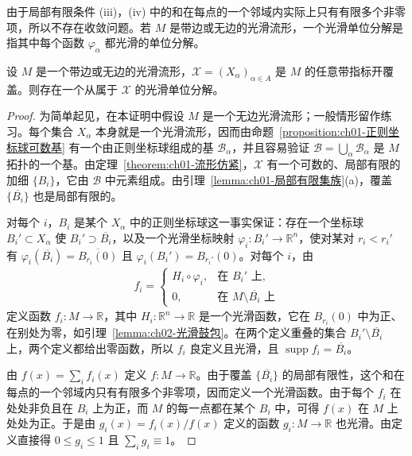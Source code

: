 \documentclass[../../main.tex]{subfiles}
\begin{document}
由于局部有限条件 (iii)，(iv) 中的和在每点的一个邻域内实际上只有有限多个非零项，所以不存在收敛问题。若 $M$ 是带边或无边的光滑流形，一个光滑单位分解是指其中每个函数 $\varphi_{\alpha}$ 都光滑的单位分解。

\begin{theorem}[单位分解的存在性]\label{theorem:ch02-单位分解存在性}
设 $M$ 是一个带边或无边的光滑流形，$\mathcal{X}=(X_{\alpha})_{\alpha\in A}$ 是 $M$ 的任意带指标开覆盖。则存在一个从属于 $\mathcal{X}$ 的光滑单位分解。
\end{theorem}

\begin{proof}
为简单起见，在本证明中假设 $M$ 是一个无边光滑流形；一般情形留作练习。每个集合 $X_{\alpha}$ 本身就是一个光滑流形，因而由命题~\cref{proposition:ch01-正则坐标球可数基} 有一个由正则坐标球组成的基 $\mathcal{B}_{\alpha}$，并且容易验证 $\mathcal{B}=\bigcup_{\alpha}\mathcal{B}_{\alpha}$ 是 $M$ 拓扑的一个基。由定理~\cref{theorem:ch01-流形仿紧}，$\mathcal{X}$ 有一个可数的、局部有限的加细 $\{B_{i}\}$，它由 $\mathcal{B}$ 中元素组成。由引理~\cref{lemma:ch01-局部有限集族}(a)，覆盖 $\{\overline{B_{i}}\}$ 也是局部有限的。

对每个 $i$，$B_{i}$ 是某个 $X_{\alpha}$ 中的正则坐标球这一事实保证：存在一个坐标球 $B_{i}'\subset X_{\alpha}$ 使 $B_{i}'\supset\overline{B_{i}}$，以及一个光滑坐标映射 $\varphi_{i}:B_{i}'\to\mathbb{R}^{n}$，使对某对 $r_{i}<r_{i}'$ 有 $\varphi_{i}(\overline{B_{i}})=\overline{B_{r_{i}}(0)}$ 且 $\varphi_{i}(B_{i}')=B_{r_{i}'}(0)$。对每个 $i$，由
\begin{align*}
f_{i}=
\begin{cases}
H_{i}\circ\varphi_{i}, & \text{在 }B_{i}'\text{ 上},\\
0, & \text{在 }M\setminus\overline{B_{i}}\text{ 上}
\end{cases}
\end{align*}
定义函数 $f_{i}:M\to\mathbb{R}$，其中 $H_{i}:\mathbb{R}^{n}\to\mathbb{R}$ 是一个光滑函数，它在 $B_{r_{i}}(0)$ 中为正、在别处为零，如引理~\cref{lemma:ch02-光滑鼓包}。在两个定义重叠的集合 $B_{i}'\setminus\overline{B_{i}}$ 上，两个定义都给出零函数，所以 $f_{i}$ 良定义且光滑，且 $\operatorname{supp}f_{i}=\overline{B_{i}}$。

由 $f(x)=\sum_{i}f_{i}(x)$ 定义 $f:M\to\mathbb{R}$。由于覆盖 $\{\overline{B_{i}}\}$ 的局部有限性，这个和在每点的一个邻域内只有有限多个非零项，因而定义一个光滑函数。由于每个 $f_{i}$ 在处处非负且在 $B_{i}$ 上为正，而 $M$ 的每一点都在某个 $B_{i}$ 中，可得 $f(x)$ 在 $M$ 上处处为正。于是由 $g_{i}(x)=f_{i}(x)/f(x)$ 定义的函数 $g_{i}:M\to\mathbb{R}$ 也光滑。由定义直接得 $0\leqslant g_{i}\leqslant 1$ 且 $\sum_{i}g_{i}\equiv 1$。


\end{proof}
\end{document}
